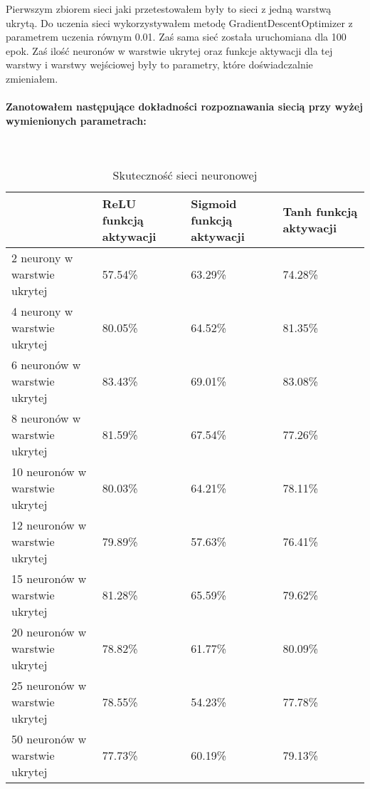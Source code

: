 \documentclass[a4paper,12pt,twoside,openany]{report}
\begin{document}
	Pierwszym zbiorem sieci jaki przetestowałem były to sieci z jedną warstwą ukrytą. Do uczenia sieci wykorzystywałem metodę GradientDescentOptimizer z parametrem uczenia równym 0.01. Zaś sama sieć została uruchomiana dla 100 epok. Zaś ilość neuronów w warstwie ukrytej oraz funkcje aktywacji dla tej warstwy i warstwy wejściowej były to parametry, które doświadczalnie zmieniałem.
	
	\paragraph{Zanotowałem następujące dokładności rozpoznawania siecią przy wyżej wymienionych parametrach:}
	
	\mbox{}\\
	
	\begin{table}[H]
		\centering
		\begin{tabularx}{\textwidth}{|X|X|X|X|}
			\hline
			\textbf{} & \textbf{ReLU funkcją aktywacji} & \textbf{Sigmoid funkcją aktywacji}  & \textbf{Tanh funkcją aktywacji}  \\ 
			
			\hline
			2 neurony w warstwie ukrytej & 57.54\% & 63.29\% & 74.28\% \\ 
			
			\hline
			4 neurony w warstwie ukrytej & 80.05\% & 64.52\% & 81.35\% \\
			
			\hline
			6 neuronów w warstwie ukrytej & 83.43\% & 69.01\% & 83.08\% \\
			
			\hline
			8 neuronów w warstwie ukrytej & 81.59\% & 67.54\% & 77.26\% \\
			
			\hline
			10 neuronów w warstwie ukrytej & 80.03\% & 64.21\% & 78.11\% \\
			
			\hline
			12 neuronów w warstwie ukrytej & 79.89\% & 57.63\% & 76.41\% \\
			
			\hline
			15 neuronów w warstwie ukrytej & 81.28\% & 65.59\% & 79.62\% \\
			
			\hline
			20 neuronów w warstwie ukrytej & 78.82\% & 61.77\% & 80.09\% \\
			
			\hline
			25 neuronów w warstwie ukrytej & 78.55\% & 54.23\% & 77.78\% \\
			
			\hline
			50 neuronów w warstwie ukrytej & 77.73\% & 60.19\% & 79.13\% \\ 
			\hline
		\end{tabularx}
		
		\caption{Skuteczność sieci neuronowej}
	\end{table}
	
\end{document}
